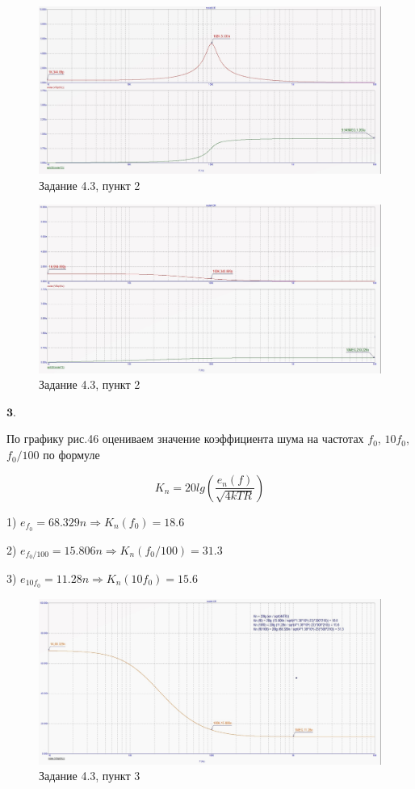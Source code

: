 \documentclass[a4paper, 14pt]{extarticle}%
\begin{document}
\begin{figure}[h!]
			\centering
			\includegraphics[width=1.1\linewidth]{4/4_3_4.jpg}
			\caption{Задание 4.3, пункт 2}
			\label{A}
\end{figure}

\begin{figure}[h!]
			\centering
			\includegraphics[width=1.1\linewidth]{4/4_3_5.jpg}
			\caption{Задание 4.3, пункт 2}
			\label{A}
\end{figure}


$\textbf{3.} $

По графику рис.46 оцениваем значение коэффициента шума на частотах $f_0$, $10f_0$, $f_0/100$ по формуле


\[  K_n = 20lg(\frac{e_n(f)}{\sqrt{4kTR}})   \]


1) $e_{f_0}= 68.329n \Rightarrow  K_n(f_0) = 18.6 $

2) $e_{f_0/100}= 15.806n \Rightarrow K_n(f_0/100) = 31.3$

3) $e_{10f_0}= 11.28n \Rightarrow  K_n(10f_0) = 15.6$


\begin{figure}[h!]
			\centering
			\includegraphics[width=1.1\linewidth]{4/4_3_1.jpg}
			\caption{Задание 4.3, пункт 3}
			\label{A}
\end{figure}
\end{document}
